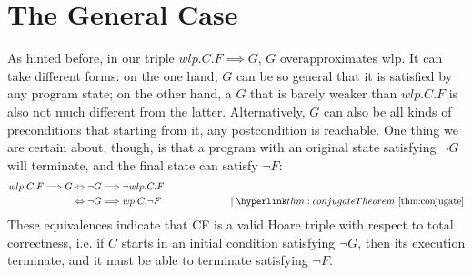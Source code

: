 




\section{The General Case}\label{sec:general}
As hinted before, in our triple $wlp.C.F\implies G$, $G$ overapproximates wlp. 
It can take different forms: on the one hand, $G$ can be so general that it is satisfied by any program state; on the other hand, a $G$ that is barely weaker than $wlp.C.F$ is also not much different from the latter. 
Alternatively, $G$ can also be all kinds of preconditions that starting from it, any postcondition is reachable. 
One thing we are certain about, though, is that a program with an original state satisfying $\neg G$ will terminate, and the final state can satisfy $\neg F$: 
\begin{align*}
wlp.C.F{\implies} G & \Leftrightarrow \neg G {\implies} \neg wlp.C.F \\
	& \Leftrightarrow \neg G {\implies} wp.C.\neg F 
	\hspace{0.2\textwidth} \mid {\thm{conjugate}}
\end{align*}
These equivalences indicate that C{\neg F} is a valid Hoare triple with respect to total correctness, i.e. if $C$ starts in an initial condition satisfying $ \neg G$, then its execution  terminate, and it must be able to terminate satisfying $\neg F$. 


